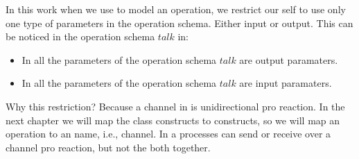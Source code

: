 In this work when we use \oz{} to model an operation, we restrict our self to use only one type of parameters in the operation schema. Either input or output. This can be noticed in the operation schema $talk$ in:
\begin{itemize}
\item In  all the parameters of the operation schema $talk$ are output paramaters.
\item In   all the parameters of the operation schema $talk$ are input paramaters.
\end{itemize}
Why this restriction? Because a channel in \picalc{} is unidirectional pro reaction. In the next chapter we will map the \oz{} class constructs to  \picalc{} constructs, so we will map an \oz{} operation to an \picalc{} name, i.e., channel. In \picalc{} a processes can send or receive over a channel pro reaction, but not the both together.